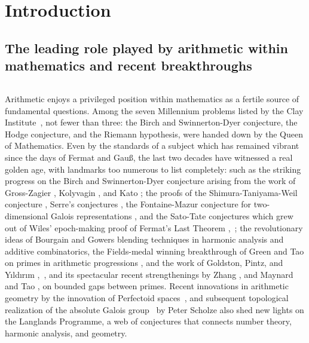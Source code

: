 \chapter*{Introduction}
\label{ch:Introduction}

\section{The leading role played by arithmetic within mathematics and recent breakthroughs}
$ $ 

Arithmetic enjoys a privileged position within mathematics as a fertile source of fundamental questions. Among the seven Millennium problems listed by the Clay Institute~\cite{Clay}, not fewer than three: the Birch and Swinnerton-Dyer conjecture, the Hodge conjecture, and the Riemann hypothesis, were handed down by the Queen of Mathematics. Even by the standards of a subject which has remained vibrant since the days of Fermat and Gau\ss, the last two decades have witnessed a real golden age, with landmarks too numerous to list completely: such as the striking progress on the Birch and Swinnerton-Dyer conjecture arising from the work of Gross-Zagier \cite{GZ1986}, Kolyvagin \cite{Ko1989}, and Kato \cite{Ka2004}; the proofs of the Shimura-Taniyama-Weil conjecture \cite{BCDT2001}, Serre's conjectures \cite{KW2009}, the Fontaine-Mazur conjecture for two-dimensional Galois representations \cite{Ki2009}, and the Sato-Tate conjectures \cite{CHR2008} which grew out of Wiles' epoch-making proof of Fermat's Last Theorem \cite{Wi1995},~\cite{TW1995}; the revolutionary ideas of Bourgain \cite{Bo2008} and Gowers \cite{Go2007} blending techniques in harmonic analysis and additive combinatorics, the Fields-medal winning breakthrough of Green and Tao on primes in arithmetic progressions \cite{GT2008}, and the work of Goldston, Pintz, and Y{\i}ld{\i}r{\i}m \cite{GPY2009},~\cite{GPY2010}, and its spectacular recent strengthenings by Zhang \cite{Zh2014}, and Maynard \cite{Ma2015} and Tao \cite{Poly2014}, on bounded gaps between primes. Recent innovations in arithmetic geometry by the innovation of Perfectoid spaces~\cite{Scho2012}, and subsequent topological realization of the absolute Galois group~\cite{Scho2016} by Peter Scholze also shed new lights on the Langlands Programme, a web of conjectures that connects number theory, harmonic analysis, and geometry.

